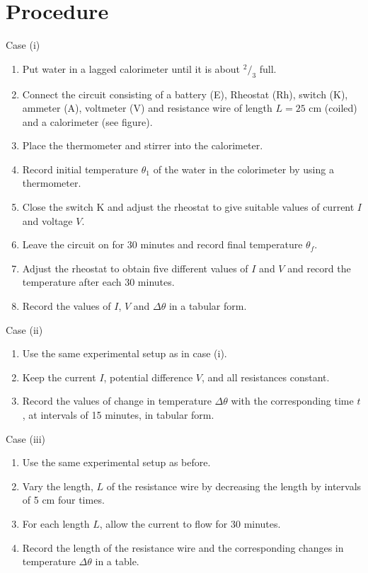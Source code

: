 \section{Procedure}
Case (i)
\begin{enumerate}
\item Put water in a lagged calorimeter until it is about $^2/_3$ full.
\item Connect the circuit consisting of a battery (E), Rheostat (Rh), switch (K), ammeter (A), voltmeter (V) and resistance wire of length $L = 25$ cm (coiled) and a calorimeter (see figure).
\item Place the thermometer and stirrer into the calorimeter.
\item Record initial temperature $\theta_1$ of the water in the colorimeter by using a thermometer.
\item Close the switch K and adjust the rheostat to give suitable values of current $I$ and voltage $V$.
\item Leave the circuit on for 30 minutes and record final temperature $\theta_f$. 
\item Adjust the rheostat to obtain five different values of $I$ and $V$ and record the temperature after each 30 minutes.
\item Record the values of $I$, $V$ and $\Delta \theta$ in a tabular form.
\end{enumerate}
\noindent
Case (ii)
\begin{enumerate}
\item Use the same experimental setup as in case (i).
\item Keep the current $I$, potential difference $V$, and all resistances constant.
\item Record the values of change in temperature $\Delta \theta$ with the corresponding time $t$, at intervals of 15 minutes, in tabular form.
\end{enumerate}
\noindent
Case (iii)
\begin{enumerate}
\item Use the same experimental setup as before.
\item Vary the length, $L$ of the resistance wire by decreasing the length by intervals of 5 cm four times.
\item For each length $L$, allow the current to flow for 30 minutes.
\item Record the length of the resistance wire and the corresponding changes in temperature $\Delta \theta$ in a table.
\end{enumerate}

